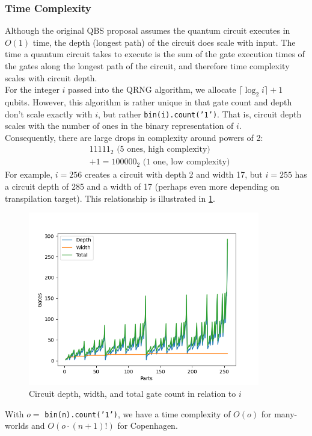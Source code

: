 \documentclass[12pt]{article}
\begin{document}
\subsubsection{Time Complexity}
Although the original QBS proposal assumes the quantum circuit executes in $O(1)$ time, the depth (longest path) of the circuit does scale with input. The time a quantum circuit takes to execute is the sum of the gate execution times of the gates along the longest path of the circuit, and therefore time complexity scales with circuit depth. \\
For the integer $i$ passed into the QRNG algorithm, we allocate $\lceil \log_2 i \rceil + 1$ qubits. However, this algorithm is rather unique in that gate count and depth don't scale exactly with $i$, but rather \texttt{bin(i).count('1')}. That is, circuit depth scales with the number of ones in the binary representation of $i$. \\
Consequently, there are large drops in complexity around powers of 2:
\begin{align*}
&11111_2 \text{  (5 ones, high complexity)} \\ &+ 1 = 100000_2 \text{  (1 one, low complexity)}
\end{align*}
For example, $i = 256$ creates a circuit with depth 2 and width 17, but $i = 255$ has a circuit depth of 285 and a width of 17 (perhaps even more depending on transpilation target). This relationship is illustrated in \ref{fig:resources}.

\begin{figure}[h]
    \centering
    \capstart
    \includegraphics[width=0.9\textwidth]{images/resources.png}
    \caption{Circuit depth, width, and total gate count in relation to $i$}
    \label{fig:resources}
\end{figure}
\vspace{10mm}
\noindent With $o = $ \texttt{bin(n).count('1')}, we have a time complexity of $O(o)$ for many-worlds and $O(o \cdot (n+1)!)$ for Copenhagen.
\end{document}
